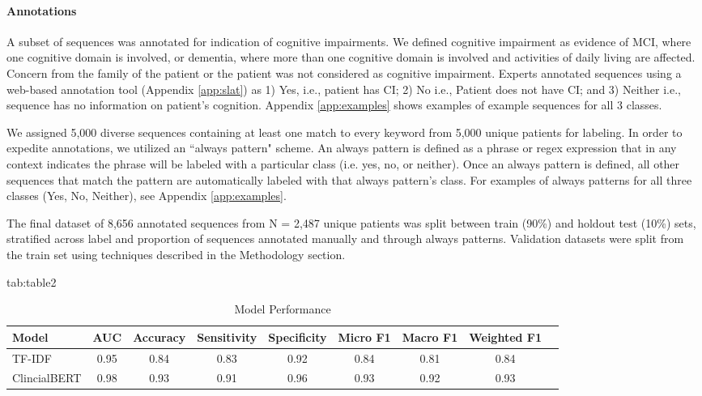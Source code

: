 \documentclass[pmlr,twocolumn,10pt]{jmlr} %
\begin{document}
\paragraph{Annotations}
\label{sec:Annotations} A subset of sequences was annotated for indication of cognitive impairments. We defined cognitive impairment as evidence of MCI, where one cognitive domain is involved, or dementia, where more than one cognitive domain is involved and activities of daily living are affected. Concern from the family of the patient or the patient was not considered as cognitive impairment. Experts annotated sequences using a web-based annotation tool (Appendix \ref{app:slat}) as 1) Yes, i.e., patient has CI; 2) No i.e., Patient does not have CI; and 3) Neither i.e., sequence has no information on patient’s cognition. Appendix \ref{app:examples} shows examples of example sequences for all 3 classes.

We assigned 5,000 diverse sequences containing at least one match to every keyword from 5,000 unique patients for labeling. In order to expedite annotations, we utilized an “always pattern" scheme. An always pattern is defined as a phrase or regex expression that in any context indicates the phrase will be labeled with a particular class (i.e. yes, no, or neither). Once an always pattern is defined, all other sequences that match the pattern are automatically labeled with that always pattern's class. For examples of always patterns for all three classes (Yes, No, Neither), see Appendix \ref{app:examples}. 

The final dataset of 8,656 annotated sequences from N = 2,487 unique patients was split between train (90\%) and holdout test (10\%) sets, stratified across label and proportion of sequences annotated manually and through always patterns. Validation datasets were split from the train set using techniques described in the Methodology section. 

\begin{table*}[hbtp]
\floatconts
{tab:table2}
{\caption{Model Performance}}
\centering
  {
  \begin{tabular}{lcccccccc}
    \toprule 
    \bfseries Model & \bfseries AUC & \bfseries Accuracy & \bfseries Sensitivity & \bfseries Specificity & \bfseries Micro F1  & \bfseries Macro F1 & \bfseries Weighted F1 \\ 
    \midrule
    TF-IDF & 0.95 & 0.84 & 0.83 & 0.92 & 0.84 & 0.81 & 0.84 \\
    ClincialBERT & 0.98 & 0.93 & 0.91 & 0.96 & 0.93 & 0.92 & 0.93 \\
    \bottomrule
  \end{tabular}
  }

  \label{tab:modelperf}
\end{table*}
\end{document}
